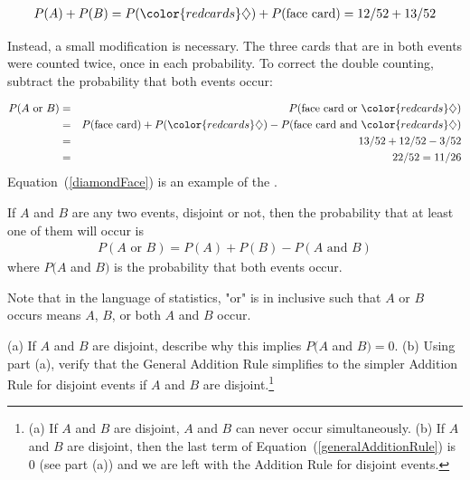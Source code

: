 \begin{eqnarray*}
	P(A) + P(B) = P({\color{redcards}\diamondsuit}) + P(\text{face card}) = 12/52 + 13/52
	\label{overCountFaceDiamond}
\end{eqnarray*}

Instead, a small modification is necessary. The three cards that are in both events were counted twice, once in each probability. To correct the double counting, subtract the probability that both events occur:

\begin{eqnarray}
P(A\text{ or } B) &=&P(\text{face card or }{\color{redcards}\diamondsuit})  \notag \\
 &=& P(\text{face card}) + P({\color{redcards}\diamondsuit}) - P(\text{face card and }{\color{redcards}\diamondsuit}) \label{diamondFace} \\
 &=& 13/52 + 12/52 - 3/52 \notag \\
 &=& 22/52 = 11/26 \notag
\end{eqnarray}
Equation~(\ref{diamondFace}) is an example of the . 

\begin{termBox}{ If $A$ and $B$ are any two events, disjoint or not, then the probability that at least one of them will occur is
\begin{eqnarray}
P(A\text{ or }B) = P(A) + P(B) - P(A\text{ and }B)
\label{generalAdditionRule}
\end{eqnarray}
where $P(A$ and $B)$ is the probability that both events occur.}
\end{termBox}


\begin{tipBox}{
Note that in the language of statistics, "or" is in inclusive such that $A$ or $B$ occurs means $A$, $B$, or both $A$ and $B$ occur.}
\end{tipBox}

\begin{exercise}
(a) If $A$ and $B$ are disjoint, describe why this implies $P(A$ and $B) = 0$. (b) Using part (a), verify that the General Addition Rule simplifies to the simpler Addition Rule for disjoint events if $A$ and $B$ are disjoint.\footnote{(a) If $A$ and $B$ are disjoint, $A$ and $B$ can never occur simultaneously. (b) If $A$ and $B$ are disjoint, then the last term of Equation~(\ref{generalAdditionRule}) is 0 (see part (a)) and we are left with the Addition Rule for disjoint events.}
\end{exercise}

